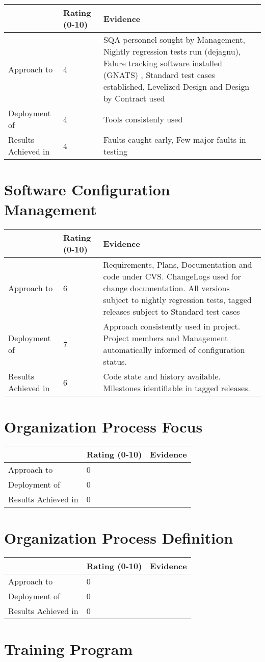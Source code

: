 \documentclass{article}
\newcommand{\KPAname}{}
\newenvironment{KPABOX}[1]
	{\renewcommand{\KPAname}{#1}
	\begin{tabular}{|p{1.0in}|p{0.5in}|p{5.0in}|} \hline
	 & Rating (0-10) & Evidence \\ \hline}
	{\end{tabular}}
\newcommand{\Approach}[2]{Approach to \KPAname & #1 & #2 \\ \hline}
\newcommand{\Deployment}[2]{Deployment of \KPAname & #1 & #2 \\ \hline}
\newcommand{\Results}[2]{Results Achieved in \KPAname & #1 & #2 \\
	\hline}
\begin{document}
\begin{KPABOX}{Software Quality Assurance}
\Approach{4}{SQA personnel sought by Management, Nightly regression
             tests run (dejagnu), Falure tracking software installed
             (GNATS) , Standard test cases established, Levelized
             Design and Design by Contract used}
\Deployment{4}{Tools consistenly used}
\Results{4}{Faults caught early, Few major faults in testing}
\end{KPABOX}

\section{Software Configuration Management}

\begin{KPABOX}{Software Configuration Management}
\Approach{6}{Requirements, Plans, Documentation and code under CVS.
             ChangeLogs used for change documentation.  All versions
             subject to nightly regression tests, tagged
             releases subject to Standard test cases}
\Deployment{7}{Approach consistently used in project. Project members
             and Management automatically informed of configuration
             status.}
\Results{6}{Code state and history available.  Milestones identifiable
            in tagged releases.}
\end{KPABOX}

\section{Organization Process Focus}

\begin{KPABOX}{Organization Process Focus}
\Approach{0}{}
\Deployment{0}{}
\Results{0}{}
\end{KPABOX}

\section{Organization Process Definition}

\begin{KPABOX}{Organization Process Definition}
\Approach{0}{}
\Deployment{0}{}
\Results{0}{}
\end{KPABOX}

\section{Training Program}
\end{document}
